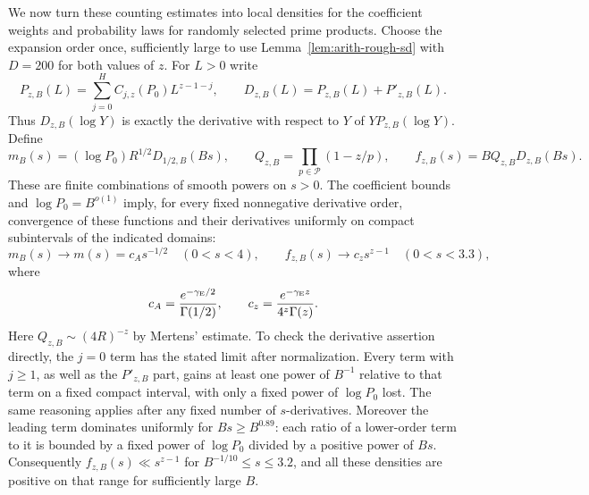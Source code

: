 We now turn these counting estimates into local densities for the
coefficient weights and probability laws for randomly selected prime products.
Choose the expansion order once, sufficiently large to use
Lemma~\ref{lem:arith-rough-sd} with $D=200$ for both values of $z$.
For $L>0$ write
\[
 P_{z,B}(L)=\sum_{j=0}^{H}C_{j,z}(P_0)L^{z-1-j},\qquad
 D_{z,B}(L)=P_{z,B}(L)+P'_{z,B}(L).
\]
Thus $D_{z,B}(\log Y)$ is exactly the derivative with respect to $Y$ of
$YP_{z,B}(\log Y)$.  Define
\[
 m_B(s)=(\log P_0)R^{1/2}D_{1/2,B}(Bs),\qquad
 Q_{z,B}=\prod_{p\in\mathcal P}(1-z/p),\qquad
 f_{z,B}(s)=B Q_{z,B}D_{z,B}(Bs).
\]
These are finite combinations of smooth powers on $s>0$.
The coefficient bounds and $\log P_0=B^{o(1)}$ imply, for every fixed
nonnegative derivative order, convergence of these functions and their
derivatives uniformly on compact subintervals of the indicated domains:
\[
 m_B(s)\longrightarrow m(s)=c_A s^{-1/2}\quad(0<s<4),\qquad
 f_{z,B}(s)\longrightarrow c_zs^{z-1}\quad(0<s<3.3),
\]
where
\[
 c_A=\frac{e^{-\gamma_{\rm E}/2}}{\Gamma(1/2)},\qquad
 c_z=\frac{e^{-\gamma_{\rm E}z}}{4^z\Gamma(z)}.
\]
Here $Q_{z,B}\sim(4R)^{-z}$ by Mertens' estimate.
To check the derivative assertion directly, the $j=0$ term has the stated
limit after normalization.  Every term with $j\ge1$, as well as the
$P'_{z,B}$ part, gains at least one power of $B^{-1}$ relative to that term
on a fixed compact interval, with only a fixed power of $\log P_0$ lost.
The same reasoning applies after any fixed number of $s$-derivatives.
Moreover the leading term dominates uniformly for $Bs\ge B^{0.89}$:
each ratio of a lower-order term to it is bounded by a fixed power of
$\log P_0$ divided by a positive power of $Bs$.
Consequently $f_{z,B}(s)\ll s^{z-1}$ for
$B^{-1/10}\le s\le3.2$, and all these densities are positive on that range
for sufficiently large $B$.

